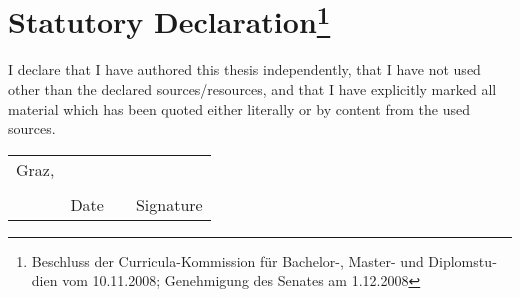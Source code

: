 
\section*{Statutory Declaration\footnote{%
\foreignlanguage{ngerman}{Beschluss der Curricula-Kommission für Bachelor-, Master- und 
Diplomstudien vom 10.11.2008; 
Genehmigung des Senates am 1.12.2008}}}

I declare that I have authored this thesis independently, that I have
not used other than the declared sources/resources, and that I have
explicitly marked all material which has been quoted either literally
or by content from the used sources.

\vfill

\newcommand{\mysignatureblock}[3]{%
  \begin{tabular}{llp{2em}l} 
  #1 & \hspace{5cm}        & & \hspace{6cm} \\\cline{2-2}\cline{4-4}
     &                     & & \\[-3mm]
     & {\footnotesize #2}  & & {\footnotesize #3}
  \end{tabular}
}

\mysignatureblock{Graz,}{Date}{Signature}

\vfill
\vfill
\vfill
\vfill



\newpage
\newpage

